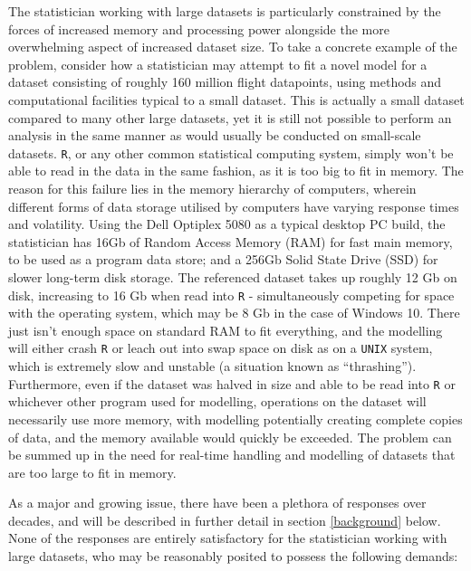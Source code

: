 The statistician working with large datasets is particularly constrained by the forces of increased memory and processing power alongside the more overwhelming aspect of increased dataset size.
To take a concrete example of the problem, consider how a statistician may attempt to fit a novel model for a dataset consisting of roughly 160 million flight datapoints\cite{bot2009flights}, using methods and computational facilities typical to a small dataset.
This is actually a small dataset compared to many other large datasets, yet it is still not possible to perform an analysis in the same manner as would usually be conducted on small-scale datasets.
\texttt{R}, or any other common statistical computing system, simply won't be able to read in the data in the same fashion, as it is too big to fit in memory.
The reason for this failure lies in the memory hierarchy of computers, wherein different forms of data storage utilised by computers have varying response times and volatility.
Using the Dell Optiplex 5080 as a typical desktop PC build, the statistician has 16Gb of Random Access Memory (RAM) for fast main memory, to be used as a program data store; and a 256Gb Solid State Drive (SSD) for slower long-term disk  storage\cite{cornell2021standardcomp}.
The referenced dataset takes up roughly 12 Gb on disk, increasing to 16 Gb when read into \texttt{R} - simultaneously competing for space with the operating system, which may be 8 Gb in the case of Windows 10.
There just isn't enough space on standard RAM to fit everything, and the modelling will either crash \texttt{R} or leach out into swap space on disk as on a \texttt{UNIX} system, which is extremely slow and unstable (a situation known as ``thrashing'')\cite{denning1968thrashing}.
Furthermore, even if the dataset was halved in size and able to be read into \texttt{R} or whichever other program used for modelling, operations on the dataset will necessarily use more memory, with modelling potentially creating complete copies of data, and the memory available would quickly be exceeded.
The problem can be summed up in the need for real-time handling and modelling of datasets that are too large to fit in memory.

As a major and growing issue, there have been a plethora of responses over decades, and will be described in further detail in section \ref{background} below.
None of the responses are entirely satisfactory for the statistician working with large datasets, who may be reasonably posited to possess the following demands:

